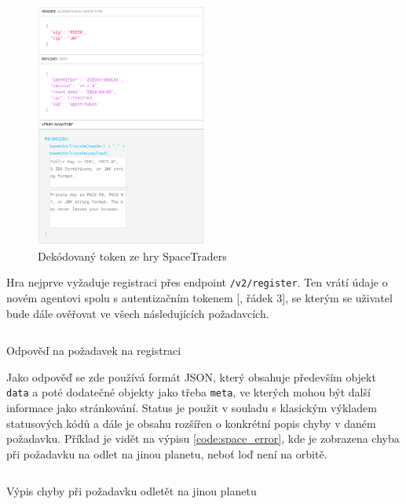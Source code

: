 \begin{figure}[!ht]
    \centering
    \includegraphics[width=0.5\textwidth]{figures/spaceTraders/jwt.png}
    \caption{Dekódovaný token ze hry SpaceTraders \cite[]{jwt_decoder}}
    \label{fig:jwt_spacetraders}
\end{figure}

Hra nejprve vyžaduje registraci přes endpoint \texttt{/v2/register}. Ten vrátí údaje o novém agentovi spolu s autentizačním tokenem [, řádek 3], se kterým se uživatel bude dále ověřovat ve všech následujících požadavcích.

\begin{listing}[!ht]
    \inputminted[breaklines]{json}{resources/code/spaceTraders/login.jsonc}
    \caption{Odpověď na požadavek na registraci\protect\footnotemark}
    \label{code:space_login}
\end{listing}

Jako odpověď se zde používá formát JSON, který obsahuje především objekt \texttt{data} a poté dodatečné objekty jako třeba \texttt{meta}, ve kterých mohou být další informace jako stránkování.
\cite{pagination}
Status je použit v souladu s klasickým výkladem statusových kódů  
a dále je obsahu rozšířen o konkrétní popis chyby v daném požadavku. Příklad je vidět na výpisu \ref{code:space_error}, kde je zobrazena chyba při požadavku na odlet na jinou planetu, neboť loď není na orbitě.


\begin{listing}[ht!]
    \inputminted[breaklines]{json}{resources/code/spaceTraders/error_response.jsonc}
    \caption{Výpis chyby při požadavku odletět na jinou planetu}
    \label{code:space_error}
\end{listing}

